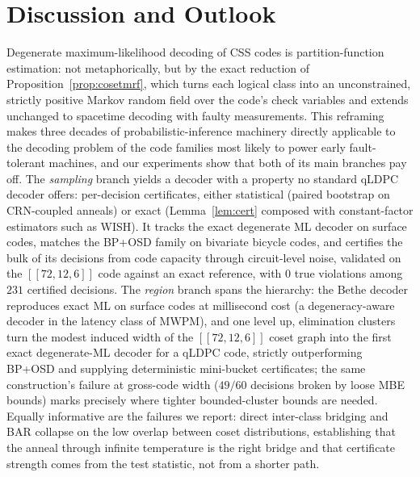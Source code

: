 \documentclass[a4paper,11pt]{quantumarticle}
\theoremstyle{definition}
\begin{document}
\section{Discussion and Outlook}
\label{sec:discussion}
Degenerate maximum-likelihood decoding of CSS codes is partition-function
estimation: not metaphorically, but by the exact reduction of
Proposition~\ref{prop:cosetmrf}, which turns each logical class into an
unconstrained, strictly positive Markov random field over the code's check
variables and extends unchanged to spacetime decoding with faulty
measurements. This reframing makes three decades of
probabilistic-inference machinery directly applicable to the decoding
problem of the code families most likely to power early fault-tolerant
machines, and our experiments show that both of its main branches pay off.
The \emph{sampling} branch yields a decoder with a property no standard
qLDPC decoder offers: per-decision certificates, either statistical
(paired bootstrap on CRN-coupled anneals) or exact (Lemma~\ref{lem:cert}
composed with constant-factor estimators such as WISH). It tracks the
exact degenerate ML decoder on surface codes, matches the BP+OSD family on
bivariate bicycle codes, and certifies the bulk of its decisions from code
capacity through circuit-level noise, validated on the
$[\![72,12,6]\!]$ code against an exact reference, with $0$ true
violations among $231$ certified decisions. The \emph{region} branch
spans the hierarchy: the Bethe decoder reproduces exact ML on surface
codes at millisecond cost (a degeneracy-aware decoder in the latency
class of MWPM), and one level up, elimination clusters turn the modest
induced width of the $[\![72,12,6]\!]$ coset graph into the first exact
degenerate-ML decoder for a qLDPC code, strictly outperforming BP+OSD and
supplying deterministic mini-bucket certificates; the same construction's
failure at gross-code width ($49/60$ decisions broken by loose
MBE bounds) marks precisely where tighter bounded-cluster bounds are
needed. Equally informative are the failures we report: direct inter-class
bridging and BAR collapse on the low overlap between coset distributions,
establishing that the anneal through infinite temperature is the right
bridge and that certificate strength comes from the test statistic, not
from a shorter path.
\end{document}
